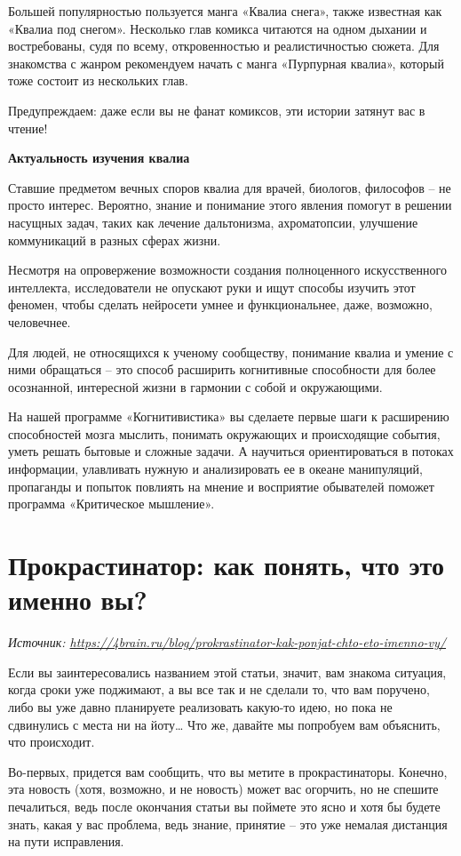 Большей популярностью пользуется манга «Квалиа снега», также известная как «Квалиа под снегом». Несколько глав комикса читаются на одном дыхании и востребованы, судя по всему, откровенностью и реалистичностью сюжета. Для знакомства с жанром рекомендуем начать с манга «Пурпурная квалиа», который тоже состоит из нескольких глав.

Предупреждаем: даже если вы не фанат комиксов, эти истории затянут вас в чтение!

\textbf{Актуальность изучения квалиа}

Ставшие предметом вечных споров квалиа для врачей, биологов, философов – не просто интерес. Вероятно, знание и понимание этого явления помогут в решении насущных задач, таких как лечение дальтонизма, ахроматопсии, улучшение коммуникаций в разных сферах жизни.

Несмотря на опровержение возможности создания полноценного искусственного интеллекта, исследователи не опускают руки и ищут способы изучить этот феномен, чтобы сделать нейросети умнее и функциональнее, даже, возможно, человечнее.

Для людей, не относящихся к ученому сообществу, понимание квалиа и умение с ними обращаться – это способ расширить когнитивные способности для более осознанной, интересной жизни в гармонии с собой и окружающими.

На нашей программе «Когнитивистика» вы сделаете первые шаги к расширению способностей мозга мыслить, понимать окружающих и происходящие события, уметь решать бытовые и сложные задачи. А научиться ориентироваться в потоках информации, улавливать нужную и анализировать ее в океане манипуляций, пропаганды и попыток повлиять на мнение и восприятие обывателей поможет программа «Критическое мышление».


\newpage
\section{Прокрастинатор: как понять, что это именно вы?}

\textit{Источник: \url{https://4brain.ru/blog/prokrastinator-kak-ponjat-chto-eto-imenno-vy/}}

Если вы заинтересовались названием этой статьи, значит, вам знакома ситуация, когда сроки уже поджимают, а вы все так и не сделали то, что вам поручено, либо вы уже давно планируете реализовать какую-то идею, но пока не сдвинулись с места ни на йоту… Что же, давайте мы попробуем вам объяснить, что происходит.

Во-первых, придется вам сообщить, что вы метите в прокрастинаторы. Конечно, эта новость (хотя, возможно, и не новость) может вас огорчить, но не спешите печалиться, ведь после окончания статьи вы поймете это ясно и хотя бы будете знать, какая у вас проблема, ведь знание, принятие – это уже немалая дистанция на пути исправления.

